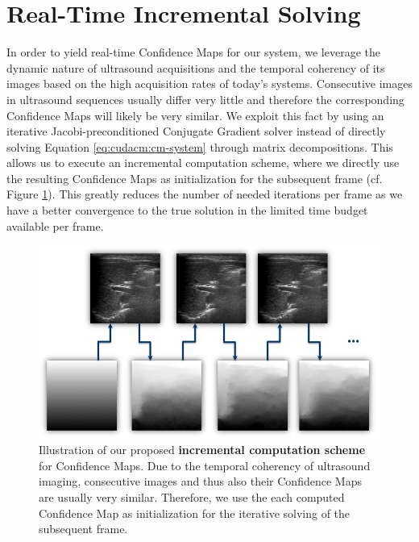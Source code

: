 \section{Real-Time Incremental Solving}
In order to yield real-time Confidence Maps for our system, we leverage the dynamic nature of ultrasound acquisitions and the temporal coherency of its images based on the high acquisition rates of today's systems.
Consecutive images in ultrasound sequences usually differ very little and therefore the corresponding Confidence Maps will likely be very similar.
We exploit this fact by using an iterative Jacobi-preconditioned Conjugate Gradient solver instead of directly solving Equation \ref{eq:cudacm:cm-system} through matrix decompositions.
This allows us to execute an incremental computation scheme, where we directly use the resulting Confidence Maps as initialization for the subsequent frame (cf. Figure \ref{fig:cudacm:incremental-computation}). 
This greatly reduces the number of needed iterations per frame as we have a better convergence to the true solution in the limited time budget available per frame. 

\begin{figure}[ht]
	\centering
	\includegraphics[width=0.75\linewidth]{./figures/cudacm/incremental-computation.png}
	\caption{Illustration of our proposed \textbf{incremental computation scheme} for Confidence Maps. Due to the temporal coherency of ultrasound imaging, consecutive images and thus also their Confidence Maps are usually very similar. Therefore, we use the each computed Confidence Map as initialization for the iterative solving of the subsequent frame.}
	\label{fig:cudacm:incremental-computation}
\end{figure}

